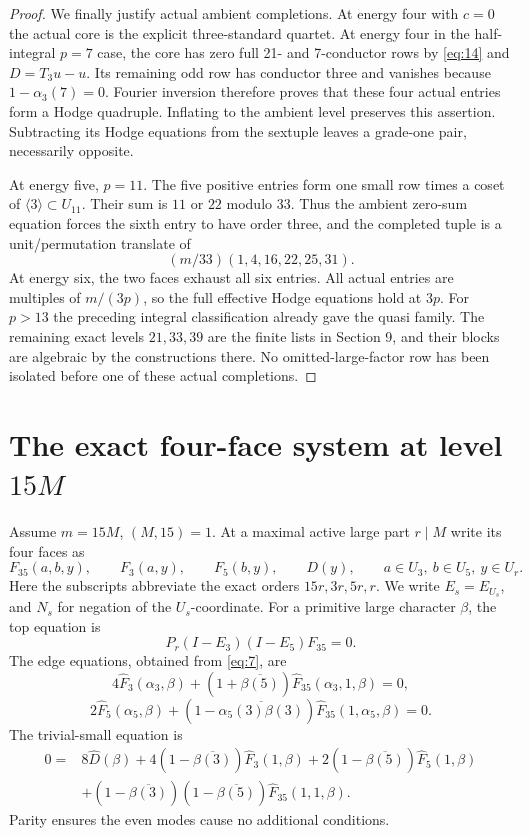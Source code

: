 \documentclass[11pt]{amsart}
\numberwithin{theorem}{section}
\theoremstyle{remark}
\numberwithin{equation}{section}
\begin{document}
\begin{proof}
We finally justify actual ambient completions. At energy four with
\(c=0\) the actual core is the explicit three-standard quartet. At
energy four in the half-integral \(p=7\) case, the core has zero full
21- and 7-conductor rows by \eqref{eq:14} and \(D=T_3u-u\). Its remaining odd
row has conductor three and vanishes because \(1-\alpha_3(7)=0\).
Fourier inversion therefore proves that these four actual entries form
a Hodge quadruple. Inflating to the ambient level preserves this
assertion. Subtracting its Hodge equations from the sextuple leaves a
grade-one pair, necessarily opposite.

At energy five, \(p=11\). The five positive entries form one small row
times a coset of \(\langle3\rangle\subset U_{11}\). Their sum is
\(11\) or \(22\) modulo \(33\). Thus the ambient zero-sum equation
forces the sixth entry to have order three, and the completed tuple is a
unit/permutation translate of
\[
(m/33)(1,4,16,22,25,31).
\]
At energy six, the two faces exhaust all six entries. All actual entries
are multiples of \(m/(3p)\), so the full effective Hodge equations hold
at \(3p\). For \(p>13\) the preceding integral classification already
gave the quasi family. The remaining exact levels \(21,33,39\) are the
finite lists in Section 9, and their blocks are algebraic by the
constructions there. No omitted-large-factor row has been isolated before
one of these actual completions.
\end{proof}

\section{The exact four-face system at level \(15M\)}\label{sec:8}

Assume \(m=15M\), \((M,15)=1\). At a maximal active large part
\(r\mid M\) write its four faces as
\[
F_{35}(a,b,y),\qquad F_3(a,y),\qquad F_5(b,y),\qquad D(y),
\qquad a\in U_3,\ b\in U_5,\ y\in U_r.
\]
Here the subscripts abbreviate the exact orders \(15r,3r,5r,r\).
We write \(E_s=E_{U_s}\), and \(N_s\) for negation of the
\(U_s\)-coordinate. For a primitive large character \(\beta\), the top
equation is
\[
P_r(I-E_3)(I-E_5)F_{35}=0.
\tag{16}\label{eq:16}
\]
The edge equations, obtained from \eqref{eq:7}, are
\[
4\widehat F_3(\alpha_3,\beta)
+(1+\overline{\beta(5)})\widehat F_{35}(\alpha_3,1,\beta)=0,
\tag{17}\label{eq:17}
\]
\[
2\widehat F_5(\alpha_5,\beta)
+(1-\overline{\alpha_5(3)\beta(3)})
\widehat F_{35}(1,\alpha_5,\beta)=0.
\tag{18}\label{eq:18}
\]
The trivial-small equation is
\[
\begin{aligned}
0={}&8\widehat D(\beta)
+4(1-\overline{\beta(3)})\widehat F_3(1,\beta)
+2(1-\overline{\beta(5)})\widehat F_5(1,\beta)\\
&+(1-\overline{\beta(3)})(1-\overline{\beta(5)})
\widehat F_{35}(1,1,\beta).
\end{aligned}
\tag{19}\label{eq:19}
\]
Parity ensures the even modes cause no additional conditions.
\end{document}
